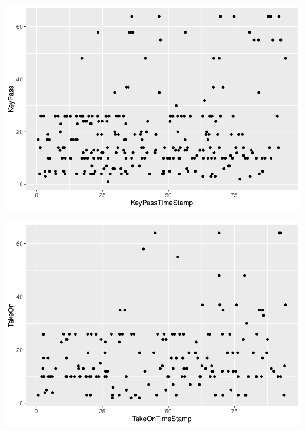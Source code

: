 \documentclass[]{article}
\newenvironment{Shaded}{\begin{snugshade}}{\end{snugshade}}
\newcommand{\DecValTok}[1]{\textcolor[rgb]{0.00,0.00,0.81}{#1}}
\newcommand{\KeywordTok}[1]{\textcolor[rgb]{0.13,0.29,0.53}{\textbf{#1}}}
\newcommand{\NormalTok}[1]{#1}
\newcommand{\OperatorTok}[1]{\textcolor[rgb]{0.81,0.36,0.00}{\textbf{#1}}}
\newcommand{\StringTok}[1]{\textcolor[rgb]{0.31,0.60,0.02}{#1}}
\begin{document}
\includegraphics{GraphAnalysis_files/figure-latex/Key Pass Game Duration-1.pdf}

\begin{Shaded}
\end{Shaded}

\includegraphics{GraphAnalysis_files/figure-latex/Take On Game Duration-1.pdf}

\begin{Shaded}
\end{Shaded}
\end{document}
